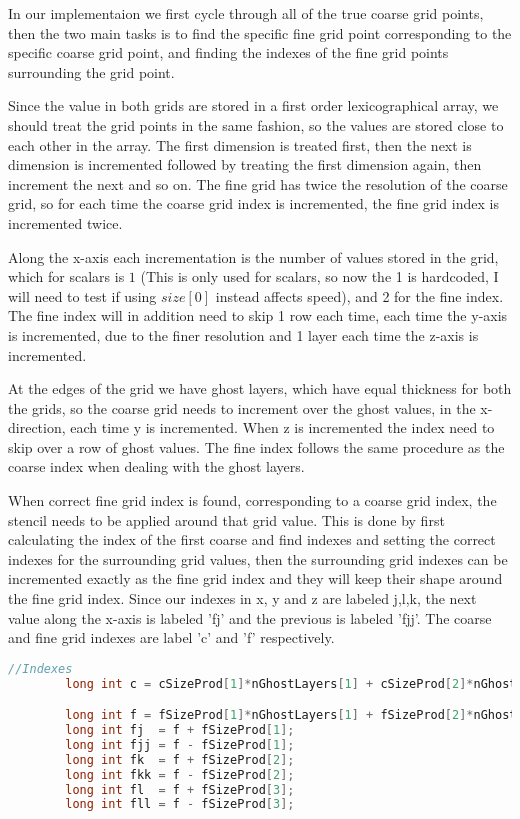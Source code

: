 	In our implementaion we first cycle through all of the true coarse grid points, then
	the two main tasks is to find the specific fine grid point corresponding to the specific
 	coarse grid point, and finding the indexes of the fine grid points surrounding the grid point.

	Since the value in both grids are stored in a first order lexicographical array, we should treat the
	grid points in the same fashion, so the values are stored close to each other in the array.
	The first dimension is treated first, then the next is dimension is incremented followed by
	treating the first dimension again, then increment the next and so on. The fine grid has twice the
	resolution of the coarse grid, so for each time the coarse grid index is incremented,
	the fine grid index is incremented twice.

	Along the x-axis each incrementation is the number of values stored in the grid, which for scalars
	is \(1\) (This is only used for scalars, so now the 1 is hardcoded, I will need to test
	if using \(size[0]\) instead affects speed), and 2 for the fine index. The fine index will in addition
	need to skip 1 row each time, each time the y-axis is incremented, due to the finer resolution and 1 layer each time
	the z-axis is incremented.

	At the edges of the grid we have ghost layers, which have equal thickness for both the grids, so the
	coarse grid needs to increment over the ghost values, in the x-direction, each time y is incremented.
	When z is incremented the index need to skip over a row of ghost values. The fine index follows
	the same procedure as the coarse index when dealing with the ghost layers.

	When correct fine grid index is found, corresponding to a coarse grid index, the stencil needs to be applied around
 	that grid value. This is done by first calculating the index of the first coarse and find indexes and setting
	the correct indexes for the surrounding grid values, then the surrounding grid indexes can be incremented
	exactly as the fine grid index and they will keep their shape around the fine grid index. Since our indexes
	in x, y and z are labeled j,l,k, the next value along the x-axis is labeled 'fj' and the previous is labeled
	'fjj'. The coarse and fine grid indexes are label 'c' and 'f' respectively.

	\begin{lstlisting}[language=c,  caption = Setting the stencil indexes]
		//Indexes
		long int c = cSizeProd[1]*nGhostLayers[1] + cSizeProd[2]*nGhostLayers[2] + cSizeProd[3]*nGhostLayers[3];

		long int f = fSizeProd[1]*nGhostLayers[1] + fSizeProd[2]*nGhostLayers[2] + fSizeProd[3]*nGhostLayers[3];
		long int fj  = f + fSizeProd[1];
		long int fjj = f - fSizeProd[1];
		long int fk  = f + fSizeProd[2];
		long int fkk = f - fSizeProd[2];
		long int fl  = f + fSizeProd[3];
	 	long int fll = f - fSizeProd[3];
	\end{lstlisting}


